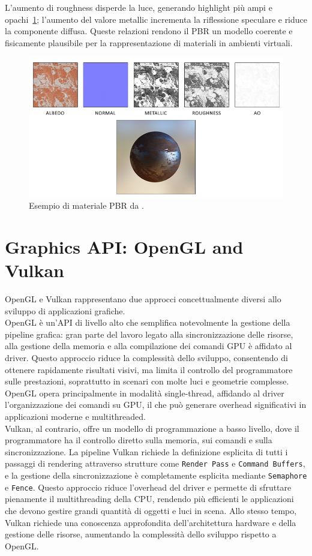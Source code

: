 \documentclass[12pt,a4paper,openright,twoside]{book}
\begin{document}
\noindent
L'aumento di roughness disperde la luce, generando highlight più ampi e opachi~\ref{fig:pbr-material-example};
l'aumento del valore metallic incrementa la riflessione speculare e riduce la componente diffusa.
Queste relazioni rendono il PBR un modello coerente e fisicamente plausibile per la rappresentazione
di materiali in ambienti virtuali.
\begin{figure}[H]
   \centering
   \includegraphics[width=.8\linewidth]{figures/pbr_material_example.png}
   \caption{Esempio di materiale PBR da \cite{learnopengl}.}
   \label{fig:pbr-material-example}
\end{figure}

\section{Graphics API: OpenGL and Vulkan}
OpenGL e Vulkan rappresentano due approcci concettualmente diversi allo sviluppo di applicazioni grafiche. \\
OpenGL è un'API di livello alto che semplifica notevolmente la gestione della pipeline grafica: gran parte del lavoro
legato alla sincronizzazione delle risorse, alla gestione della memoria e alla compilazione dei comandi GPU è affidato
al driver. Questo approccio riduce la complessità dello sviluppo, consentendo di ottenere rapidamente risultati visivi,
ma limita il controllo del programmatore sulle prestazioni, soprattutto in scenari con molte luci e geometrie complesse.
OpenGL opera principalmente in modalità single-thread, affidando al driver l'organizzazione dei comandi su GPU, il che può
generare overhead significativi in applicazioni moderne e multithreaded. \\
Vulkan, al contrario, offre un modello di programmazione a basso livello, dove il programmatore ha il controllo diretto
sulla memoria, sui comandi e sulla sincronizzazione. La pipeline Vulkan richiede la definizione esplicita di tutti i
passaggi di rendering attraverso strutture come \texttt{Render Pass} e \texttt{Command Buffers}, e la gestione della 
sincronizzazione è completamente esplicita mediante \texttt{Semaphore} e \texttt{Fence}. Questo approccio riduce
l'overhead del driver e permette di sfruttare pienamente il multithreading della CPU, rendendo più efficienti
le applicazioni che devono gestire grandi quantità di oggetti e luci in scena. Allo stesso tempo, Vulkan richiede
una conoscenza approfondita dell'architettura hardware e della gestione delle risorse, aumentando la complessità
dello sviluppo rispetto a OpenGL.
\end{document}

